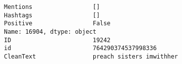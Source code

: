 \documentclass[11pt]{article}
\begin{document}
\begin{Verbatim}[commandchars=\\\{\}]
Mentions                 []                                                                                                                                                                                                                                                                                                                                                                                                    
Hashtags                 []                                                                                                                                                                                                                                                                                                                                                                                                    
Positive                 False                                                                                                                                                                                                                                                                                                                                                                                                 
Name: 16904, dtype: object
ID                       19242                                                                                                                                                                                                                                                                                                                                                                                                                                     
id                       764290374537998336                                                                                                                                                                                                                                                                                                                                                                                                                        
CleanText                preach sisters imwithher                                                                                                                                                                                                                                                                                                                                                                                                                  

\end{Verbatim}
\end{document}

